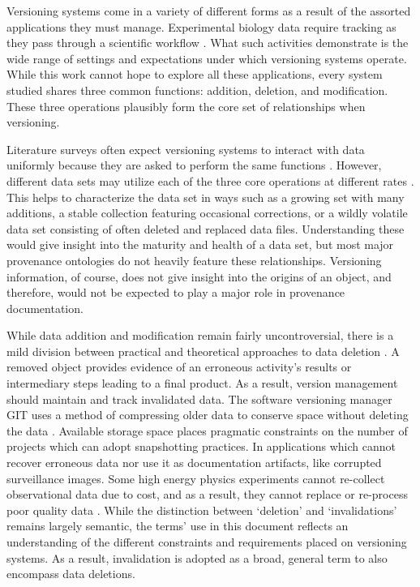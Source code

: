 Versioning systems come in a variety of different forms as a result of the assorted applications they must manage.
Experimental biology data require tracking as they pass through a scientific workflow \cite{Tagger2005}.
What such activities demonstrate is the wide range of settings and expectations under which versioning systems operate.
While this work cannot hope to explore all these applications, every system studied shares three common functions: addition, deletion, and modification.
These three operations plausibly form the core set of relationships when versioning.

Literature surveys often expect versioning systems to interact with data uniformly because they are asked to perform the same functions \cite{Tagger2005}.
However, different data sets may utilize each of the three core operations at different rates \cite{rohtua}.
This helps to characterize the data set in ways such as a growing set with many additions, a stable collection featuring occasional corrections, or a wildly volatile data set consisting of often deleted and replaced data files.
Understanding these would give insight into the maturity and health of a data set, but most major provenance ontologies do not heavily feature these relationships.
Versioning information, of course, does not give insight into the origins of an object, and therefore, would not be expected to play a major role in provenance documentation.

While data addition and modification remain fairly uncontroversial, there is a mild division between practical and theoretical approaches to data deletion \cite{Flouris04clotho:transparent}.
A removed object provides evidence of an erroneous activity's results or intermediary steps leading to a final product.
As a result, version management should maintain and track invalidated data.
The software versioning manager GIT uses a method of compressing older data to conserve space without deleting the data \cite{Chacon:2009:PG:1618548}.
Available storage space places pragmatic constraints on the number of projects which can adopt snapshotting practices.
In applications which cannot recover erroneous data nor use it as documentation artifacts, like corrupted surveillance images.
Some high energy physics experiments cannot re-collect observational data due to cost, and as a result, they cannot replace or re-process poor quality data \cite{Cavanaugh2002}.
While the distinction between `deletion' and `invalidations' remains largely semantic, the terms' use in this document reflects an understanding of the different constraints and requirements placed on versioning systems.
As a result, invalidation is adopted as a broad, general term to also encompass data deletions.

